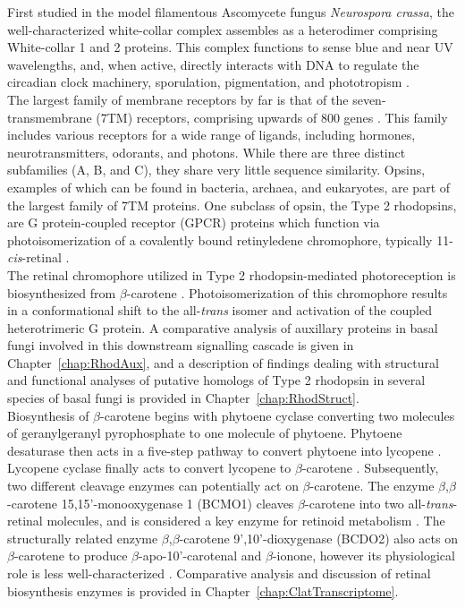 \indent First studied in the model filamentous Ascomycete fungus \textit{Neurospora crassa}, the well-characterized white-collar complex assembles as a heterodimer comprising White-collar 1 and 2 proteins. This complex functions to sense blue and near UV wavelengths, and, when active, directly interacts with DNA to regulate the circadian clock machinery, sporulation, pigmentation, and phototropism \cite{Ballario1997,Purschwitz2006,Corrochano2007}. \\
\indent The largest family of membrane receptors by far is that of the seven-transmembrane (7TM) receptors, comprising upwards of 800 genes \cite{Pierce2002}. This family includes various receptors for a wide range of ligands, including hormones, neurotransmitters, odorants, and photons. While there are three distinct subfamilies (A, B, and C), they share very little sequence similarity. Opsins, examples of which can be found in bacteria, archaea, and eukaryotes, are part of the largest family of 7TM proteins. One subclass of opsin, the Type 2 rhodopsins, are G protein-coupled receptor (GPCR) proteins which function via photoisomerization of a covalently bound retinyledene chromophore, typically 11-\textit{cis}-retinal \cite{Wald1968}.\\
\indent The retinal chromophore utilized in Type 2 rhodopsin-mediated photoreception is biosynthesized from $\beta$-carotene \cite{VonLintig2000}. Photoisomerization of this chromophore results in a conformational shift to the all-\textit{trans} isomer \cite{Smith2010} and activation of the coupled heterotrimeric G protein. A comparative analysis of auxillary proteins in basal fungi involved in this downstream signalling cascade is given in Chapter~\ref{chap:RhodAux}, and a description of findings dealing with structural and functional analyses of putative homologs of Type 2 rhodopsin in several species of basal fungi is provided in Chapter~\ref{chap:RhodStruct}.\\
\indent Biosynthesis of $\beta$-carotene begins with phytoene cyclase
converting two molecules of geranylgeranyl pyrophosphate to one
molecule of phytoene. Phytoene desaturase then acts in a five-step pathway to convert phytoene into lycopene \cite{Hausmann2000}. Lycopene cyclase finally acts to convert lycopene to $\beta$-carotene \cite{Cunningham1994}. Subsequently, two different cleavage enzymes can potentially act on $\beta$-carotene. The enzyme $\beta$,$\beta$-carotene 15,15'-monooxygenase 1 (BCMO1) cleaves $\beta$-carotene into two all-\textit{trans}-retinal molecules, and is considered a key enzyme for retinoid metabolism \cite{Lietz2012}. The structurally related enzyme $\beta$,$\beta$-carotene 9',10'-dioxygenase (BCDO2) also acts on $\beta$-carotene to produce $\beta$-apo-10'-carotenal and $\beta$-ionone, however its physiological role is less well-characterized \cite{Lobo2012}. Comparative analysis and discussion of retinal biosynthesis enzymes is provided in Chapter~\ref{chap:ClatTranscriptome}.\\
